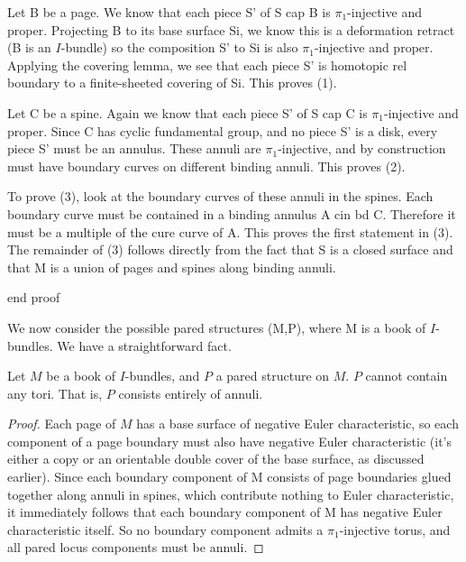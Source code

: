 Let B be a page. We know that each piece S' of S cap B is $\pi_1$-injective and
proper. Projecting B to its base surface Si, we know this is a deformation
retract (B is an $I$-bundle) so the composition S' to Si is also $\pi_1$-injective
and proper. Applying the covering lemma, we see that each piece S' is homotopic
rel boundary to a finite-sheeted covering of Si. This proves (1).

Let C be a spine. Again we know that each piece S' of S cap C is $\pi_1$-injective
and proper. Since C has cyclic fundamental group, and no piece S' is a disk,
every piece S' must be an annulus. These annuli are $\pi_1$-injective, and by
construction must have boundary curves on different binding annuli.  This
proves (2).

To prove (3), look at the boundary curves of these annuli in the spines. Each
boundary curve must be contained in a binding annulus A cin bd C. Therefore it
must be a multiple of the cure curve of A. This proves the first statement in
(3). The remainder of (3) follows directly from the fact that S is a closed
surface and that M is a union of pages and spines along binding annuli.

end proof

We now consider the possible pared structures (M,P), where M is a book of
$I$-bundles. We have a straightforward fact.

\begin{prop}

Let $M$ be a book of $I$-bundles, and $P$ a pared structure on $M$. $P$ cannot
contain any tori.  That is, $P$ consists entirely of annuli.

\end{prop}

\begin{proof}

Each page of $M$ has a base surface of negative Euler characteristic, so each
component of a page boundary must also have negative Euler characteristic (it's
either a copy or an orientable double cover of the base surface, as discussed
earlier). Since each boundary component of M consists of page boundaries glued
together along annuli in spines, which contribute nothing to Euler
characteristic, it immediately follows that each boundary component of M has
negative Euler characteristic itself. So no boundary component admits
a $\pi_1$-injective torus, and all pared locus components must be annuli.

\end{proof}

